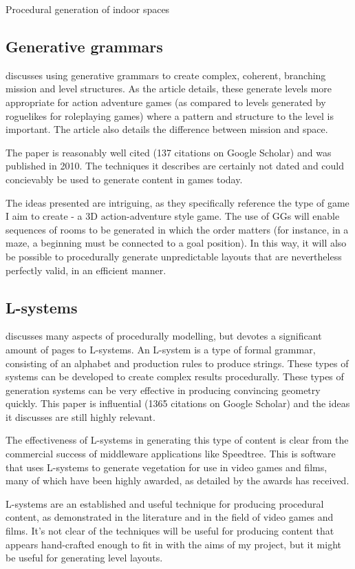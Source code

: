 \documentclass[review]{cmpreport}
\begin{document}
\begin{section}{Procedural generation of indoor spaces}
\subsection{Generative grammars}
\cite{Dormans:2010:ALD:1814256.1814257} discusses using generative grammars to create complex, coherent, branching mission and level structures. As the article details, these generate levels more appropriate for action adventure games (as compared to levels generated by roguelikes for roleplaying games) where a pattern and structure to the level is important. The article also details the difference between mission and space. \par
The paper is reasonably well cited (137 citations on Google Scholar) and was published in 2010. The techniques it describes are certainly not dated and could concievably be used to generate content in games today. \par  
The ideas presented are intriguing, as they specifically reference the type of game I aim to create - a 3D action-adventure style game. The use of GGs will enable sequences of rooms to be generated in which the order matters (for instance, in a maze, a beginning must be connected to a goal position). In this way, it will also be possible to procedurally generate unpredictable layouts that are nevertheless perfectly valid, in an efficient manner. 

\subsection{L-systems}
\cite{ebert2003texturing} discusses many aspects of procedurally modelling, but devotes a significant amount of pages to L-systems. An L-system is a type of formal grammar, consisting of an alphabet and production rules to produce strings. These types of systems can be developed to create complex results procedurally. These types of generation systems can be very effective in producing convincing geometry quickly. This paper is influential (1365 citations on Google Scholar) and the ideas it discusses are still highly relevant. \par
The effectiveness of L-systems in generating this type of content is clear from the commercial success of middleware applications like Speedtree. This is software that uses L-systems to generate vegetation for use in video games and films, many of which have been highly awarded, as detailed by the awards \cite{speedtree} has received. \par
L-systems are an established and useful technique for producing procedural content, as demonstrated in the literature and in the field of video games and films. It's not clear of the techniques will be useful for producing content that appears hand-crafted enough to fit in with the aims of my project, but it might be useful for generating level layouts. 



\end{section}
\end{document}
